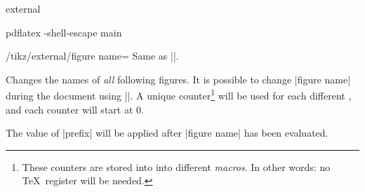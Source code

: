 {\begin{pgfplotslibrary}{external}
\begin{command}{}
\begin{codeexample}
\end{codeexample}
\begin{codeexample}
pdflatex -shell-escape main
\end{codeexample}
\end{command}

\begin{key}{/tikz/external/figure name=}
	Same as ||.
\end{key}
\begin{command}{}
	Changes the names of \emph{all} following figures. It is possible to change |figure name| during the document using ||. A unique counter\footnote{These counters are stored into into different \emph{macros}. In other words: no \TeX\ register will be needed.} will be used for each different , and each counter will start at $0$.

	The value of |prefix| will be applied after |figure name| has been evaluated.
\end{command}
\end{pgfplotslibrary}}
